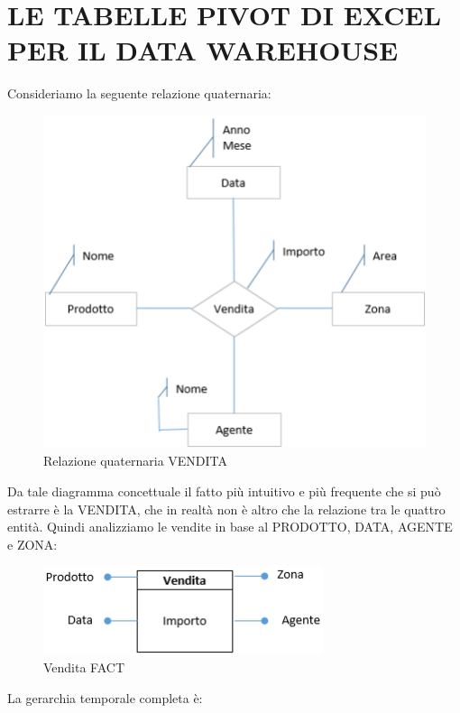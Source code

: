 \section{LE TABELLE PIVOT DI EXCEL PER IL DATA WAREHOUSE}

Consideriamo la seguente relazione quaternaria:

\begin{center}
\begin{figure}[H]
\centering
\includegraphics[scale=1]{figures/quat.png}
\caption{Relazione quaternaria VENDITA}
\end{figure}
\end{center}

Da tale diagramma concettuale il fatto più intuitivo e più frequente che si può estrarre è la VENDITA, che in realtà non è altro che la relazione tra le quattro entità. Quindi analizziamo le vendite in base al PRODOTTO, DATA, AGENTE e ZONA:

\begin{center}
\begin{figure}[H]
\centering
\includegraphics[scale=1]{figures/vendita2.png}
\caption{Vendita FACT}
\end{figure}
\end{center}

La gerarchia temporale completa è:


